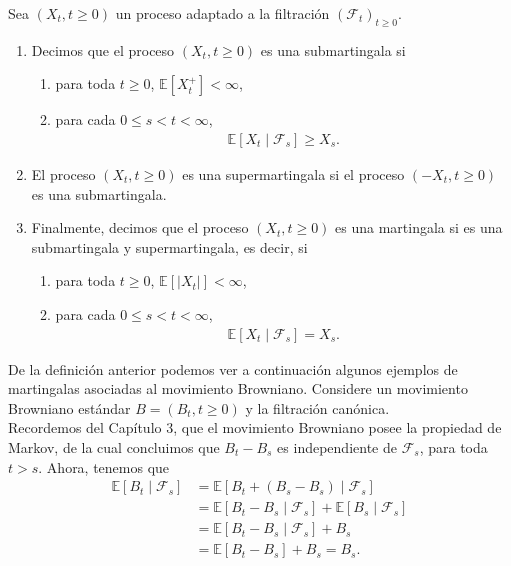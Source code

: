 \begin{definition}
	Sea $(X_t, t \geq 0)$ un proceso adaptado a la filtración $(\mathcal{F}_t)_{t \geq 0}$.
    \begin{enumerate}
	\item Decimos que el proceso $(X_t, t \geq 0)$ es una submartingala si
    	\begin{enumerate}
		\item para toda $t \geq 0$, $\mathbb{E}[X_t^{+}] < \infty$,
        \item para cada $0 \leq s < t < \infty$,
        \begin{align*}
			\mathbb{E}[X_t \mid \mathcal{F}_s] \geq X_s.
		\end{align*}
		\end{enumerate}
    \item El proceso $(X_t, t \geq 0)$ es una supermartingala si el proceso $(-X_t, t \geq 0)$ es una submartingala.
    \item Finalmente, decimos que el proceso $(X_t, t \geq 0)$ es una martingala si es una submartingala y supermartingala, es decir, si
    \begin{enumerate}
	\item para toda $t \geq 0$, $\mathbb{E}[|X_t|] < \infty$,
    \item para cada $0 \leq s < t < \infty$,
 	   \begin{align*}
			\mathbb{E}[X_t \mid \mathcal{F}_s] = X_s.
		\end{align*}
	\end{enumerate}
	\end{enumerate}
\end{definition}

De la definición anterior podemos ver a continuación algunos ejemplos de martingalas asociadas al movimiento Browniano. Considere un movimiento Browniano estándar $B = (B_t, t \geq 0)$ y la filtración canónica. \\

Recordemos del Capítulo 3, que el movimiento Browniano posee la propiedad de Markov, de la cual concluimos que $B_t - B_s$ es independiente de $\mathcal{F}_s$, para toda $t > s$. Ahora, tenemos que
\begin{align*}
	\mathbb{E}[B_t \mid \mathcal{F}_s] & = \mathbb{E}[B_t + (B_s - B_s) \mid \mathcal{F}_s] \\
    & = \mathbb{E}[B_t - B_s \mid \mathcal{F}_s] + \mathbb{E}[B_s \mid \mathcal{F}_s] \\
    & = \mathbb{E}[B_t - B_s \mid \mathcal{F}_s] + B_s \\
    & = \mathbb{E}[B_t - B_s] + B_s = B_s.
\end{align*}

